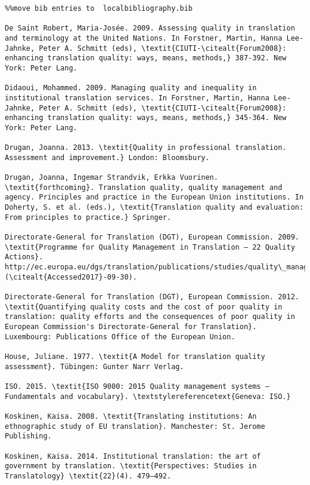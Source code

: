 \documentclass[output=paper]{langsci/langscibook}
\begin{document}
\begin{verbatim}%%move bib entries to  localbibliography.bib 

De Saint Robert, Maria-Josée. 2009. Assessing quality in translation and terminology at the United Nations. In Forstner, Martin, Hanna Lee-Jahnke, Peter A. Schmitt (eds), \textit{CIUTI-\citealt{Forum2008}: enhancing translation quality: ways, means, methods,} 387-392. New York: Peter Lang. 

Didaoui, Mohammed. 2009. Managing quality and inequality in institutional translation services. In Forstner, Martin, Hanna Lee-Jahnke, Peter A. Schmitt (eds), \textit{CIUTI-\citealt{Forum2008}: enhancing translation quality: ways, means, methods,} 345-364. New York: Peter Lang. 

Drugan, Joanna. 2013. \textit{Quality in professional translation. Assessment and improvement.} London: Bloomsbury.

Drugan, Joanna, Ingemar Strandvik, Erkka Vuorinen. \textit{forthcoming}. Translation quality, quality management and agency. Principles and practice in the European Union institutions. In Doherty, S. et al. (eds.), \textit{Translation quality and evaluation: From principles to practice.} Springer.

Directorate-General for Translation (DGT), European Commission. 2009. \textit{Programme for Quality Management in Translation – 22 Quality Actions}. http://ec.europa.eu/dgs/translation/publications/studies/quality\_management\_translation\_en.pdf (\citealt{Accessed2017}-09-30).

Directorate-General for Translation (DGT), European Commission. 2012. \textit{Quantifying quality costs and the cost of poor quality in translation: quality efforts and the consequences of poor quality in European Commission's Directorate-General for Translation}. Luxembourg: Publications Office of the European Union.

House, Juliane. 1977. \textit{A Model for translation quality assessment}. Tübingen: Gunter Narr Verlag. 

ISO. 2015. \textit{ISO 9000: 2015 Quality management systems – Fundamentals and vocabulary}. \textstylereferencetext{Geneva: ISO.}

Koskinen, Kaisa. 2008. \textit{Translating institutions: An ethnographic study of EU translation}. Manchester: St. Jerome Publishing.

Koskinen, Kaisa. 2014. Institutional translation: the art of government by translation. \textit{Perspectives: Studies in Translatology} \textit{22}(4). 479–492.


\end{verbatim}
\end{document}
